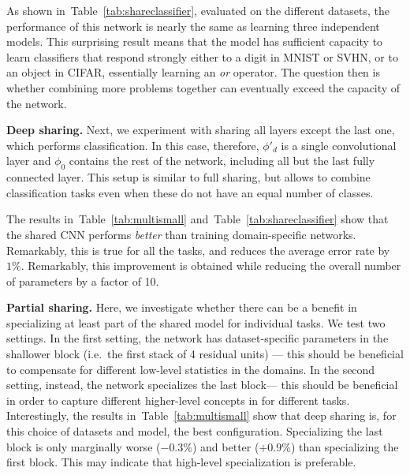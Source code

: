 \documentclass[10pt,twocolumn,letterpaper]{article}
\renewcommand{\paragraph}[1]{\par\medskip\noindent\textbf{#1}}
\begin{document}
As shown in~Table~\ref{tab:shareclassifier}, evaluated on the different datasets, the performance of this network is nearly the same as learning three independent models. This surprising result means that the model has sufficient capacity to learn classifiers that respond strongly either to a digit in MNIST or SVHN, or to an object in CIFAR, essentially learning an \emph{or} operator. The question then is whether combining more problems together can eventually exceed the capacity of the network.

\paragraph{Deep sharing.} Next, we experiment with sharing all layers except the last one, which  performs classification. In this case, therefore, $\phi'_d$ is a single convolutional layer and $\phi_0$ contains the rest of the network, including all but the last fully connected layer. This setup is similar to full sharing, but allows to combine classification tasks even when these do not have an equal number of classes.

The results in~Table~\ref{tab:multismall} and~Table~\ref{tab:shareclassifier} show that the shared CNN performs \emph{better} than training domain-specific networks. Remarkably, this is true for all the tasks, and reduces the average error rate by $1\%$. Remarkably, this improvement is obtained while reducing the overall number of parameters by a factor of 10.

\paragraph{Partial sharing.} Here, we investigate whether there can be a benefit in specializing at least part of the shared model for individual tasks. We test two settings. In the first setting, the network has dataset-specific parameters in the shallower block (i.e.\ the first stack of 4 residual units) --- this should be beneficial to compensate for different low-level statistics in the domains.  In the second setting, instead, the network specializes the last block--- this should be beneficial in order to capture different higher-level concepts in for different tasks. Interestingly, the results in~Table~\ref{tab:multismall} show that deep sharing is, for this choice of datasets and model, the best configuration. Specializing the last block is only marginally worse ($-0.3\%$) and better ($+0.9\%$) than specializing the first block. This may indicate that high-level specialization is preferable.
\end{document}
